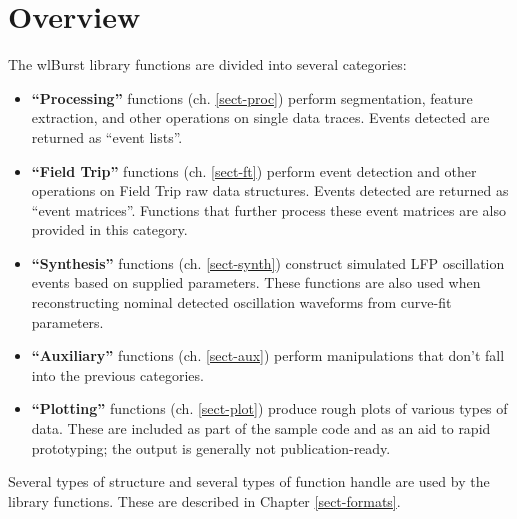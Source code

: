 
\chapter{Overview}
\label{sect-over}

The wlBurst library functions are divided into several categories:
\begin{itemize}
%
\item \textbf{``Processing''} functions (ch. \ref{sect-proc}) perform
segmentation, feature extraction, and other operations on single data
traces. Events detected are returned as ``event lists''.
%
\item \textbf{``Field Trip''} functions (ch. \ref{sect-ft}) perform event
detection and other operations on Field Trip raw data structures. Events
detected are returned as ``event matrices''. Functions that further process
these event matrices are also provided in this category.
%
\item \textbf{``Synthesis''} functions (ch. \ref{sect-synth}) construct
simulated LFP oscillation events based on supplied parameters. These
functions are also used when reconstructing nominal detected oscillation
waveforms from curve-fit parameters.
%
\item \textbf{``Auxiliary''} functions (ch. \ref{sect-aux}) perform
manipulations that don't fall into the previous categories.
%
\item \textbf{``Plotting''} functions (ch. \ref{sect-plot}) produce rough
plots of various types of data. These are included as part of the sample
code and as an aid to rapid prototyping; the output is generally not
publication-ready.
%
\end{itemize}

Several types of structure and several types of function handle are used by
the library functions. These are described in Chapter \ref{sect-formats}.

%
